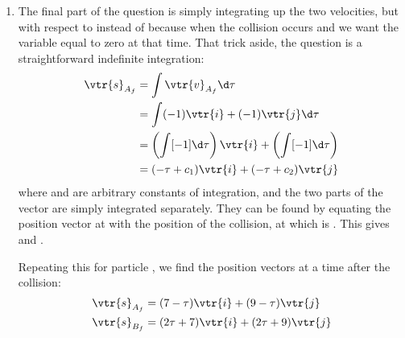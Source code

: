 \begin{problem}[A1988FMIVQ1a]
{\begin{enumerate}
Solving  Equations \eqref{CoM_vtr_i}, \eqref{CoM_vtr_j}, \eqref{CoE_vtr} and \eqref{1D_vtr_x} for the 4 unknowns produces two solutions: the initial conditions,  $=$  and  $=$  which correspond to  and  but also the final velocities we are looking for. Writing them in vector form:
\begin{eqnarray*} 
\vtr{v}_{A_{f}} &= - \vtr{i}  - \vtr{j} \\ 
\vtr{v}_{B_{f}} &= 2\vtr{i} + 2\vtr{j} 
\end{eqnarray*}
which is simply a swapping over of velocities, as expected in an elastic collision with identical particles.
	\item The final part of the question is simply integrating up the two velocities, but with respect to \vari{\tau} instead of  because  when the collision occurs and we want the variable equal to zero at that time. That trick aside, the question is a straightforward indefinite integration:
\begin{eqnarray*}
 \vtr{s}_{A_{f}} &= \int \vtr{v}_{A_{f}} \d \tau \\ 
 &= \int (-1)\vtr{i} + (-1)\vtr{j} \d \tau \\
  &= \left( \int [-1] \d \tau \right)\vtr{i} + \left( \int [-1] \d \tau \right) \\ 
  &= (-\tau + c_{1})\vtr{i} + (-\tau + c_{2})\vtr{j} 
  \end{eqnarray*} 
 where  and  are arbitrary constants of integration, and the two parts of the vector are simply integrated separately. They can be found by equating the position vector  at  with the position of the collision,  at  which is . This gives  and .

Repeating this for particle , we find the position vectors at a time \vari{\tau} after the collision:
\begin{eqnarray*}
 \vtr{s}_{A_{f}} &= (7 - \tau)\vtr{i} + (9 - \tau)\vtr{j} \\ 
 \vtr{s}_{B_{f}} &= (2\tau + 7)\vtr{i} + (2\tau + 9)\vtr{j} 
 \end{eqnarray*}
\end{enumerate}
}
\end{problem}